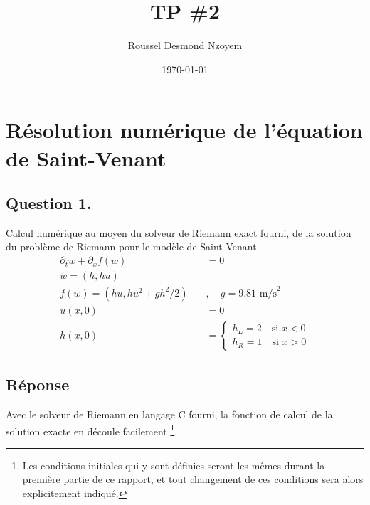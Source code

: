 \documentclass[
	french,
	11pt, %
]{fphw}
\title{TP \#2} %
\author{Roussel Desmond Nzoyem} %
\date{\today} %
\institute{Université de Strasbourg \\ UFR de Mathématiques et Informatique} %
\begin{document}
\maketitle %



\section*{Résolution numérique de l'équation de Saint-Venant}

\subsection*{Question 1.}
\begin{problem}
	Calcul numérique au moyen du solveur de Riemann exact fourni, de la solution du problème de Riemann pour le modèle de Saint-Venant.
	\begin{align*}
		\partial_t w + \partial_x f(w) &=0 \\
		w = (h,hu)\\
		f(w) = (hu, hu^2 + gh^2/2) \quad &, \quad g=9.81 \text{ m/s}^2 \tag{1}\\
		u(x,0) &= 0 \\
		h(x,0) &= 
		\begin{cases}
			h_L = 2 \quad \text{si } x<0 \\
			h_R = 1 \quad \text{si } x>0
		\end{cases}
		\label{eq:stVenant}
	\end{align*}
\end{problem}


\subsection*{Réponse} 

Avec le solveur de Riemann en langage C fourni, la fonction de calcul de la solution exacte en découle facilement \footnote{Les conditions initiales qui y sont définies seront les mêmes durant la première partie de ce rapport, et tout changement de ces conditions sera alors explicitement indiqué.}.
\end{document}
